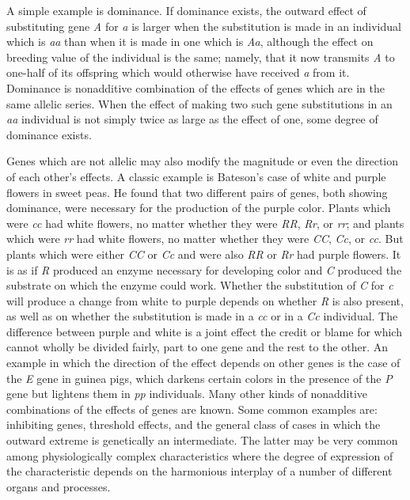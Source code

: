 A simple example is dominance. If dominance exists, the outward
effect of substituting gene \textit{A} for \textit{a} is larger when the
substitution is made in an individual which is \textit{aa} than when it
is made in one which is \textit{Aa}, although the effect on breeding value
of the individual is the same; namely, that it now transmits \textit{A} to
one-half of its offspring which would otherwise have received \textit{a}
from it. Dominance is nonadditive combination of the effects of genes which
are in the same allelic series. When the effect of making two such gene
substitutions in an \textit{aa} individual is not simply twice as large as
the effect of one, some degree of dominance exists.

Genes which are not allelic may also modify the magnitude or even the
direction of each other's effects. A classic example is Bateson's case of
white and purple flowers in sweet peas. He found that two different pairs of
genes, both showing dominance, were necessary for the production of the purple
color. Plants which were \textit{cc} had white flowers, no matter whether they
were \textit{RR}, \textit{Rr}, or \textit{rr}; and plants which were \textit{rr}
had white flowers, no matter whether they were \textit{CC}, \textit{Cc}, or
\textit{cc}. But plants which were either \textit{CC} or \textit{Cc} and were also
\textit{RR} or \textit{Rr} had purple flowers. It is as if \textit{R} produced an
enzyme necessary for developing color and \textit{C} produced the substrate on which
the enzyme could work. Whether the substitution of \textit{C} for \textit{c} will
produce a change from white to purple depends on whether \textit{R} is also present,
as well as on whether the substitution is made in a \textit{cc} or in a \textit{Cc}
individual. The difference between purple and white is a joint effect the credit or
blame for which cannot wholly be divided fairly, part to one gene and the rest to the
other. An example in which the direction of the effect depends on other genes is the
case of the \textit{E} gene in guinea pigs, which darkens certain colors in the presence
of the \textit{P} gene but lightens them in \textit{pp} individuals. Many other kinds of
nonadditive combinations of the effects of genes are known. Some common examples are:
inhibiting genes, threshold effects, and the general class of cases in which the outward
extreme is genetically an intermediate. The latter may be very common among physiologically
complex characteristics where the degree of expression of the characteristic depends on
the harmonious interplay of a number of different organs and processes.

